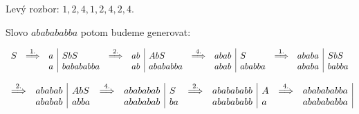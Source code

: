 Levý rozbor: $1, 2, 4, 1, 2, 4, 2, 4$. 

Slovo $ababababba$ potom budeme generovat: 

\[
\begin{array}{c c r|l c r|l c r|l c r|l}
    S & \stackrel{1.}{\Longrightarrow} & a & SbS & \stackrel{2.}{\Longrightarrow} & ab & AbS & \stackrel{4.}{\Longrightarrow} & abab & S & \stackrel{1.}{\Longrightarrow} & ababa & SbS \\ 
    & & a & babababba & & ab & abababba & & abab & ababba & & ababa & babba \\
\end{array}
\]

\[
\begin{array}{c r|l c r|l c r|l c r|}
    \stackrel{2.}{\Longrightarrow} & ababab & AbS & \stackrel{4.}{\Longrightarrow} &  abababab & S & \stackrel{2.}{\Longrightarrow} & ababababb & A & \stackrel{4.}{\Longrightarrow} & ababababba\\
    & ababab & abba & & abababab & ba & & ababababb & a & & ababababba \\
\end{array}
\]


     
